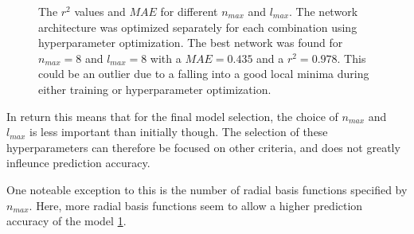 \begin{figure}[!htb]
  \endminipage
  \caption{
  The $r^2$ values and $MAE$ for different $n_{max}$ and $l_{max}$.
  The network architecture was optimized separately for each combination using hyperparameter optimization.
  The best network was found for $n_{max}=8$ and $l_{max}=8$ with a $MAE=0.435$ and a $r^2 = 0.978$.
  This could be an outlier due to a falling into a good local minima during either training or hyperparameter optimization.
  }
  \label{fig:snap_hyperparameter}
\end{figure}


In return this means that for the final model selection, the choice of $n_{max}$ and $l_{max}$ is less important
than initially though.
The selection of these hyperparameters can therefore be focused on other criteria, and does not greatly infleunce prediction accuracy.

One noteable exception to this is the number of radial basis functions specified by $n_{max}$.
Here, more radial basis functions seem to allow a higher prediction accuracy of the model \ref{fig:snap_hyperparameter}.


